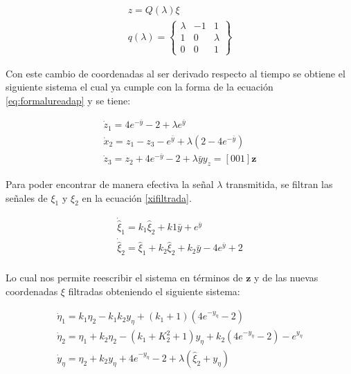 \begin{equation}
	\begin{array}{l}
		z = Q(\lambda)\xi \\
		q(\lambda) = \begin{Bmatrix}
			\lambda & -1 & 1\\
			1 & 0 & \lambda\\
			0 & 0 & 1
		\end{Bmatrix}
	\end{array}
\end{equation}

Con este cambio de coordenadas al ser derivado respecto al tiempo se obtiene el siguiente sistema el cual ya cumple con la forma de la ecuación \ref{eq:formalureadap} y se tiene:

\begin{equation}
	\begin{array}{l}
		\dot{z}_1 = 4e^{-\bar{y}} - 2 + \lambda e^{\bar{y}}\\
		\dot{x}_2 = z_1 - z_3 - e^{\bar{y}} + \lambda (2-4e^{-\bar{y}})\\
		\dot{z}_3 = z_2 + 4e^{-\bar{y}} - 2 + \lambda \bar{y}
		y_z = [0 0 1]\bm z
	\end{array}
\end{equation}

Para poder encontrar de manera efectiva la señal $\lambda$ transmitida, se filtran las señales de $\xi_1$ y $\xi_2$ en la ecuación \ref{xifiltrada}.

\begin{equation}\label{xifiltrada}
	\begin{array}{l}
		\dot{\hat{\xi}}_1 = k_1 \hat{\xi}_2 + k1\bar{y} + e^{\bar{y}}\\
		\dot{\hat{\xi}}_2 = \hat{\xi}_1 + k_2 \hat{\xi}_2 + k_2 \bar{y} -4e^{\bar{y}} + 2\\
	\end{array}
\end{equation}

Lo cual nos permite reescribir el sistema en términos de $\bm z$ y de las nuevas coordenadas $\xi$ filtradas obteniendo el siguiente sistema:

\begin{equation}\label{eq:nuevorossler}
	\begin{array}{l}
		\dot{\eta}_1 = k_1 \eta_2 - k_1k_2 y_\eta + (k_1 + 1)(4e^{-y_\eta}-2)\\
		\dot{\eta}_2 = \eta_1 + k_2 \eta_2 - (k_1 + K_2^2 + 1)y_\eta + k_2(4e^{-y_\eta} - 2) - e^{y_\eta}\\
		\dot{y}_\eta = \eta_2 + k_2y_\eta + 4e^{-y_\eta} - 2 + \lambda(\hat{\xi}_2 + y_\eta)
	\end{array}
\end{equation}

